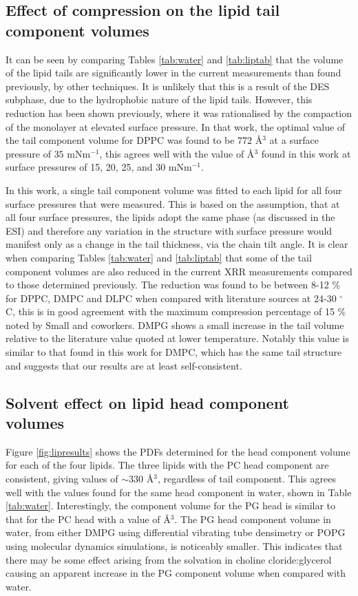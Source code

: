 \documentclass[twoside,twocolumn,9pt]{article}
\begin{document}
\subsection{Effect of compression on the lipid tail component volumes}
It can be seen by comparing Tables \ref{tab:water} and \ref{tab:liptab} that the volume of the lipid tails are significantly lower in the current measurements than found previously, by other techniques. It is unlikely that this is a result of the DES subphase, due to the hydrophobic nature of the lipid tails. However, this reduction has been shown previously,\cite{Campbell2018} where it was rationalised by the compaction of the monolayer at elevated surface pressure. In that work, the optimal value of the tail component volume for DPPC was found to be $772$ \AA${^3}$ at a surface pressure of $35$ mNm$^{-1}$, this agrees well with the value of  \AA$^3$ found in this work at surface pressures of 15, 20, 25, and 30 mNm$^{-1}$.

In this work, a single tail component volume was fitted to each lipid for all four surface pressures that were measured. This is based on the assumption, that at all four surface pressures, the lipids adopt the same phase (as discussed in the ESI) and therefore any variation in the structure with surface pressure would manifest only as a change in the tail thickness, via the chain tilt angle. It is clear when comparing Tables \ref{tab:water} and \ref{tab:liptab} that some of the tail component volumes are also reduced in the current XRR measurements compared to those determined previously. The reduction was found to be between 8-12 \% for DPPC, DMPC and DLPC when compared with literature sources at 24-30 $^\circ$C, this is in good agreement with the maximum compression percentage of 15 \% noted by Small and coworkers.\cite{Small1984} DMPG shows a small increase in the tail volume relative to the literature value quoted at lower temperature. Notably this value is similar to that found in this work for DMPC, which has the same tail structure and suggests that our results are at least self-consistent.

\subsection{Solvent effect on lipid head component volumes}
Figure \ref{fig:lipresults} shows the PDFs determined for the head component volume for each of the four lipids. The three lipids with the PC head component are consistent, giving values of $\sim330$ \AA$^3$, regardless of tail component. This agrees well with the values found for the same head component in water, shown in Table \ref{tab:water}. Interestingly, the component volume for the PG head is similar to that for the PC head with a value of \AA$^3$. The PG head component volume in water, from either DMPG using differential vibrating tube densimetry\cite{Pan2012} or POPG using molecular dynamics simulations,\cite{Kucerka2012} is noticeably smaller. This indicates that there may be some effect arising from the solvation in choline cloride:glycerol causing an apparent increase in the PG component volume when compared with water.
\end{document}
